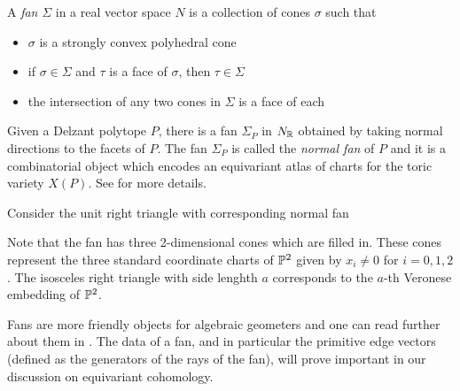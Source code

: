 \begin{definition}
    A \emph{fan} $\Sigma$ in a real vector space $N$ is a collection of cones
    $\sigma$ such that \begin{itemize}
        \item $\sigma$ is a strongly convex polyhedral cone
        \item if $\sigma\in\Sigma$ and $\tau$ is a face of $\sigma$, then $\tau\in\Sigma$
        \item the intersection of any two cones in $\Sigma$ is a face of each
    \end{itemize}
\end{definition}

Given a Delzant polytope $P$, there is a fan $\Sigma_P$ in $N_\R$ obtained by taking 
normal directions to the facets of $P$. The fan $\Sigma_P$ is called the \emph{normal fan} of $P$
and it is a combinatorial object which encodes an equivariant atlas of charts for the toric variety $X(P)$.
See \cite{cls} for more details. 



\begin{example}
    Consider the unit right triangle with corresponding normal fan
    \begin{center}
    \end{center} 
    Note that the fan has three 2-dimensional cones which are filled in.
    These cones represent the three standard coordinate charts of $\P^2$ given by
    $x_i \neq 0$ for $i = 0,1,2$. The isosceles right triangle with
    side lenghth $a$ corresponds to the $a$-th Veronese 
    embedding of $\P^2$.
\end{example}
Fans are more friendly objects for algebraic geometers and 
one can read further about them in \cite{cls}. The data of a fan,
and in particular the primitive edge vectors (defined as the generators of the rays of the fan),
will prove important in our discussion on equivariant cohomology.

